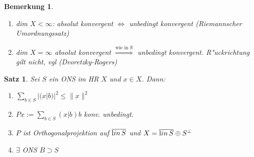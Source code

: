 \documentclass[a4paper,11pt]{book}
\newcommand{\R}{{\mathbb R}}
\newcommand{\lin}{\ensuremath{\text lin}\,} %
\newtheorem{Sa}[Def]{Satz}
\newtheorem*{BemNO}{Bemerkung}
\theoremstyle{nonumberplain}
\begin{document}
\begin{BemNO}
\begin{enumerate}
\item dim $X < \infty$: absolut konvergent $\Leftrightarrow$ unbedingt konvergent (Riemannscher Umordnungssatz)

\item dim $X = \infty$ absolut konvergent $\stackrel{\text{wie in } \R}{\Rightarrow}$ unbedingt konvergent. R"uckrichtung gilt nicht, vgl (Dvoretzky-Rogers)
\end{enumerate}
\end{BemNO}


\begin{Sa}
Sei $S$ ein ONS im HR $X$ und $x \in X$. Dann:
\begin{enumerate}
\item[a)] $\sum_{b \in S} |(x|b)|^2 \leq \|x\|^2$

\item[b)] $Px := \sum_{b \in S} (x|b)b$ konv. unbedingt.

\item[c)] $P$ ist Orthogonalprojektion auf $\overline{\lin S}$ und $X = \overline{\lin S} \oplus  S^{\perp}$

\item[d)] $\exists$ ONS $B \supset S$
\end{enumerate}
\end{Sa}
\end{document}

